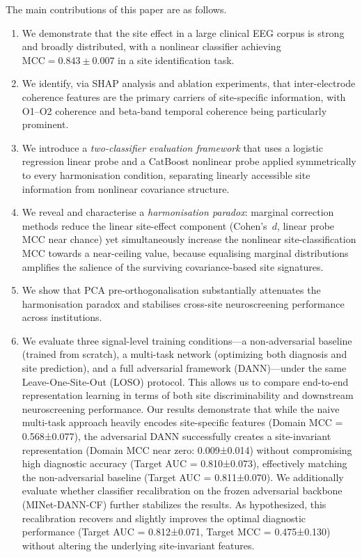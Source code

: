 \documentclass[preprint,12pt]{elsarticle}
\begin{document}
The main contributions of this paper are as follows.
\begin{enumerate}
  \item We demonstrate that the site effect in a large clinical EEG
        corpus is strong and broadly distributed, with a nonlinear
        classifier achieving $\mathrm{MCC} = 0.843 \pm 0.007$ in a
        site identification task.
  \item We identify, via SHAP analysis and ablation experiments, that
        inter-electrode coherence features are the primary carriers of
        site-specific information, with O1--O2 coherence and beta-band
        temporal coherence being particularly prominent.
  \item We introduce a \emph{two-classifier evaluation framework}
        that uses a logistic regression linear probe and a CatBoost
        nonlinear probe applied symmetrically to every harmonisation
        condition, separating linearly accessible site information
        from nonlinear covariance structure.
  \item We reveal and characterise a \emph{harmonisation paradox}:
        marginal correction methods reduce the linear site-effect
        component (Cohen's~$d$, linear probe MCC near chance) yet
        simultaneously increase the nonlinear site-classification
        MCC towards a near-ceiling value, because equalising marginal
        distributions amplifies the salience of the surviving
        covariance-based site signatures.
  \item We show that PCA pre-orthogonalisation substantially
        attenuates the harmonisation paradox and stabilises
        cross-site neuroscreening performance across institutions.
  \item We evaluate three signal-level training conditions—a non-adversarial baseline (trained from scratch), a multi-task network (optimizing both diagnosis and site prediction), and a full adversarial framework (DANN)—under the same Leave-One-Site-Out (LOSO) protocol. This allows us to compare end-to-end representation learning in terms of both site discriminability and downstream neuroscreening performance. Our results demonstrate that while the naive multi-task approach heavily encodes site-specific features (Domain MCC = 0.568±0.077), the adversarial DANN successfully creates a site-invariant representation (Domain MCC near zero: 0.009±0.014) without compromising high diagnostic accuracy (Target AUC = 0.810±0.073), effectively matching the non-adversarial baseline (Target AUC = 0.811±0.070). We additionally evaluate whether classifier recalibration on the frozen adversarial backbone (MINet-DANN-CF) further stabilizes the results. As hypothesized, this recalibration recovers and slightly improves the optimal diagnostic performance (Target AUC = 0.812±0.071, Target MCC = 0.475±0.130) without altering the underlying site-invariant features.
\end{enumerate}
\end{document}
